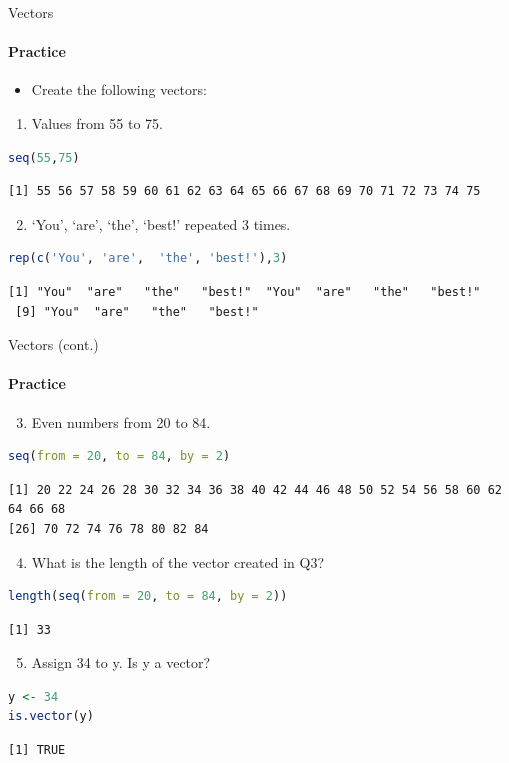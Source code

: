 \begin{frame}[fragile]{Vectors}
\framesubtitle{Practice}
\begin{itemize}
  \item Create the following vectors:
\end{itemize}
\begin{enumerate}
  \item Values from 55 to 75.
\end{enumerate}
\begin{lstlisting}[language=R]
seq(55,75)
\end{lstlisting}
\begin{lstlisting}[style=output]
 [1] 55 56 57 58 59 60 61 62 63 64 65 66 67 68 69 70 71 72 73 74 75
\end{lstlisting}
\begin{enumerate}\setcounter{enumi}{1}
  \item ‘You’, ‘are’, ‘the’, ‘best!’ repeated 3 times.
\end{enumerate}
\begin{lstlisting}[language=R]
rep(c('You', 'are',  'the', 'best!'),3)
\end{lstlisting}
\begin{lstlisting}[style=output]
 [1] "You"  "are"   "the"   "best!"  "You"  "are"   "the"   "best!"
 [9] "You"  "are"   "the"   "best!"
\end{lstlisting}
\end{frame}

\begin{frame}[fragile]{Vectors (cont.)}
\framesubtitle{Practice}
\begin{enumerate}\setcounter{enumi}{2}
  \item Even numbers from 20 to 84.
\end{enumerate}
\begin{lstlisting}[language=R]
seq(from = 20, to = 84, by = 2)
\end{lstlisting}
\begin{lstlisting}[style=output]
 [1] 20 22 24 26 28 30 32 34 36 38 40 42 44 46 48 50 52 54 56 58 60 62 64 66 68
[26] 70 72 74 76 78 80 82 84
\end{lstlisting}
\begin{enumerate}\setcounter{enumi}{3}
  \item What is the length of the vector created in Q3?
\end{enumerate}
\begin{lstlisting}[language=R]
length(seq(from = 20, to = 84, by = 2))
\end{lstlisting}
\begin{lstlisting}[style=output]
[1] 33
\end{lstlisting}
\begin{enumerate}\setcounter{enumi}{4}
  \item Assign 34 to y. Is y a vector?
\end{enumerate}
\begin{lstlisting}[language=R]
y <- 34
is.vector(y)
\end{lstlisting}
\begin{lstlisting}[style=output]
[1] TRUE
\end{lstlisting}
\end{frame}

